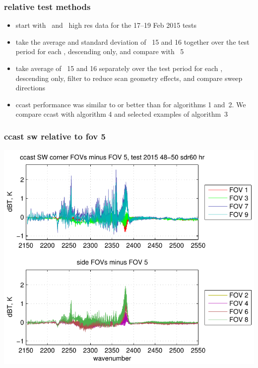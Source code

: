 \documentclass[11pt]{beamer}
\begin{document}
\begin{frame}
\frametitle{relative test methods}

\begin{itemize}

  \item start with \ccast\ and \noaa\ high res {\sdr} data for the
    17--19 Feb 2015 tests

  \item take the average and standard deviation of \for\ 15 and 16
    together over the test period for each \fov, descending only,
    and compare with \fov\ 5

  \item take average of \for\ 15 and 16 separately over the test
    period for each \fov, descending only, filter to reduce scan
    geometry effects, and compare sweep directions
    
  \item ccast performance was similar to or better than {\noaa} for
    algorithms 1 and~2.  We compare ccast with {\noaa} algorithm 4
    and selected examples of algorithm~3
    
\end{itemize}

\end{frame}
\begin{frame}
\frametitle{ccast sw relative to fov 5}
\begin{center}
  \includegraphics[scale=0.7]{figures/ccast_SW_dif_2015_48-50_sdr60_hr.pdf}
\end{center}
\end{frame}
\end{document}
